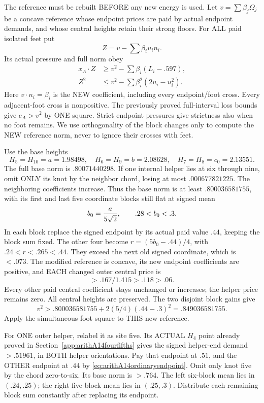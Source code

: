\documentclass[11pt]{article}
\begin{document}
The reference must be rebuilt BEFORE any
new energy is used.
Let \(v=\sum\beta_j\Omega_j\) be a concave
reference whose endpoint prices are paid
by actual endpoint demands, and whose
central heights retain their strong floors.
For ALL paid isolated feet put
\[
                         Z=v-\sum\beta_i u_i n_i .
\]
Its actual pressure and full norm obey
\[
 \begin{split}
 x_A\cdot Z&\ge v^2-\sum\beta_i(L_i-.597),\\
 Z^2&\le v^2-\sum\beta_i^2(2u_i-u_i^2).
 \end{split}
\]
Here \(v\cdot n_i=\beta_i\) is the NEW
coefficient, including every endpoint/foot
cross.  Every adjacent-foot cross is
nonpositive.
The previously proved full-interval loss
bounds give \(e_A>v^2\) by ONE square.
Strict endpoint pressures give strictness
also when no foot remains.
We use orthogonality of the block changes
only to compute the NEW reference norm,
never to ignore their crosses with feet.

Use the base heights
\[
 H_5=H_{10}=a=1.98498,\quad
 H_6=H_9=b=2.08628,\quad
 H_7=H_8=c_0=2.13551 .
\]
The full base norm is \(.80071440298\).
If one internal helper lies at six through
nine, omit ONLY its knot by the neighbor
chord, losing at most \(.000677821225\).
The neighboring coefficients increase.
Thus the base norm is at least
\(.800036581755\), with its first and
last five coordinate blocks still flat
at signed mean
\[
                           b_0={a\over5\sqrt2},\qquad .28<b_0<.3 .
\]
In each block replace the signed endpoint
by its actual paid value \(.44\), keeping
the block sum fixed.
The other four become
\(r=(5b_0-.44)/4\), with
\(.24<r<.265<.44\).
They exceed the next old signed coordinate,
which is \(<.073\).
The modified reference is concave, its
new endpoint coefficients are positive,
and EACH changed outer central price is
\[
                    >.167/1.415>.118>.06 .
\]
Every other paid central coefficient stays
unchanged or increases; the helper price
remains zero.
All central heights are preserved.
The two disjoint block gains give
\[
              v^2>.800036581755+
                            2(5/4)(.44-.3)^2=.849036581755 .
\tag{A14ord0}\label{eq:arithA14ordinarynoouter}
\]
Apply the simultaneous-foot square to
THIS new reference.

For ONE outer helper, relabel it as site
five.  Its ACTUAL \(H_4\) point already
proved in Section~\ref{app:arithA14fourfifths}
gives the signed helper-end demand \(>.51961\),
in BOTH helper orientations.
Pay that endpoint at \(.51\), and the
OTHER endpoint at \(.44\) by
\eqref{eq:arithA14ordinaryendpoint}.
Omit only knot five by the chord zero-to-six.
Its base norm is \(>.764\).
The left six-block mean lies in \((.24,.25)\);
the right five-block mean lies in \((.25,.3)\).
Distribute each remaining block sum
constantly after replacing its endpoint.
\end{document}
